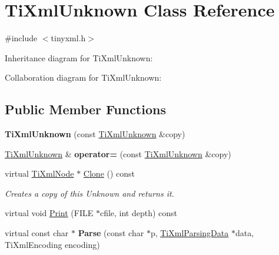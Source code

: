 \hypertarget{class_ti_xml_unknown}{\section{Ti\+Xml\+Unknown Class Reference}
\label{class_ti_xml_unknown}
}


{\ttfamily \#include $<$tinyxml.\+h$>$}



Inheritance diagram for Ti\+Xml\+Unknown\+:


Collaboration diagram for Ti\+Xml\+Unknown\+:
\subsection*{Public Member Functions}
\begin{DoxyCompactItemize}
\item 
\hypertarget{class_ti_xml_unknown_abe798ff4feea31474850c7f0de6bdf5e}{{\bfseries Ti\+Xml\+Unknown} (const \hyperlink{class_ti_xml_unknown}{Ti\+Xml\+Unknown} \&copy)}\label{class_ti_xml_unknown_abe798ff4feea31474850c7f0de6bdf5e}

\item 
\hypertarget{class_ti_xml_unknown_a60560b5aacb4bdc8b2b5f02f0a99c5c0}{\hyperlink{class_ti_xml_unknown}{Ti\+Xml\+Unknown} \& {\bfseries operator=} (const \hyperlink{class_ti_xml_unknown}{Ti\+Xml\+Unknown} \&copy)}\label{class_ti_xml_unknown_a60560b5aacb4bdc8b2b5f02f0a99c5c0}

\item 
\hypertarget{class_ti_xml_unknown_a675c4b2684af35e4c7649b7fd5ae598d}{virtual \hyperlink{class_ti_xml_node}{Ti\+Xml\+Node} $\ast$ \hyperlink{class_ti_xml_unknown_a675c4b2684af35e4c7649b7fd5ae598d}{Clone} () const }\label{class_ti_xml_unknown_a675c4b2684af35e4c7649b7fd5ae598d}

\begin{DoxyCompactList}\small\item\em Creates a copy of this Unknown and returns it. \end{DoxyCompactList}\item 
virtual void \hyperlink{class_ti_xml_unknown_a025f19c21ef01ea9be50febb8fe0ba06}{Print} (F\+I\+L\+E $\ast$cfile, int depth) const 
\item 
\hypertarget{class_ti_xml_unknown_aa51c2694e4177b5f0b5429ee5a81b58d}{virtual const char $\ast$ {\bfseries Parse} (const char $\ast$p, \hyperlink{class_ti_xml_parsing_data}{Ti\+Xml\+Parsing\+Data} $\ast$data, Ti\+Xml\+Encoding encoding)}\label{class_ti_xml_unknown_aa51c2694e4177b5f0b5429ee5a81b58d}


\end{DoxyCompactItemize}
